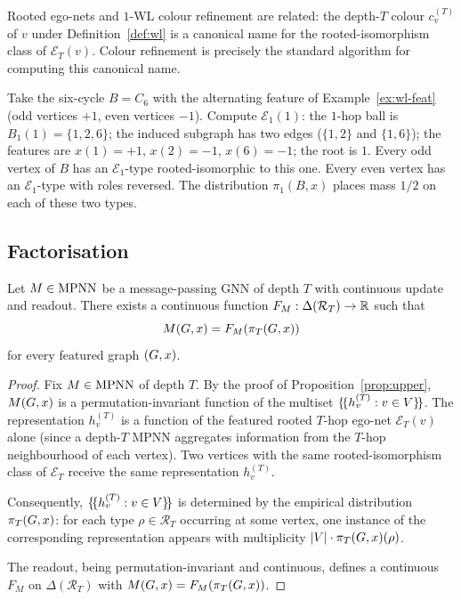 Rooted ego-nets and $1$-WL colour refinement are related: the
depth-$T$ colour $c_v^{(T)}$ of $v$ under Definition~\ref{def:wl} is a canonical
name for the rooted-isomorphism class of $\mathcal{E}_T(v)$. Colour
refinement is precisely the standard algorithm for computing this
canonical name.

\begin{example}\label{ex:egonet-c6}
Take the six-cycle $B = C_6$ with the alternating feature of
Example~\ref{ex:wl-feat} (odd vertices $+1$, even vertices $-1$). Compute
$\mathcal{E}_1(1)$: the $1$-hop ball is $B_1(1) = \{1, 2, 6\}$; the
induced subgraph has two edges ($\{1, 2\}$ and $\{1, 6\}$); the
features are $x(1) = +1$, $x(2) = -1$, $x(6) = -1$; the root is $1$.
Every odd vertex of $B$ has an $\mathcal{E}_1$-type
rooted-isomorphic to this one. Every even vertex has an
$\mathcal{E}_1$-type with roles reversed. The distribution $\pi_1(B,
x)$ places mass $1/2$ on each of these two types.
\end{example}

\subsection{Factorisation}

\begin{proposition}\label{prop:egonet-factorisation}
Let $M \in \mathrm{MPNN}$ be a message-passing GNN of depth $T$ with
continuous update and readout. There exists a continuous function
$F_M : \Delta(\mathcal{R}_T) \to \mathbb{R}$ such that
\[
M(G, x) = F_M\!\left(\pi_T(G, x)\right)
\]
for every featured graph $(G, x)$.
\end{proposition}

\begin{proof}
Fix $M \in \mathrm{MPNN}$ of depth $T$. By the proof of Proposition~\ref{prop:upper},
$M(G, x)$ is a permutation-invariant function of the multiset
$\{\!\{h_v^{(T)} : v \in V\}\!\}$. The representation
$h_v^{(T)}$ is a function of the featured rooted $T$-hop ego-net
$\mathcal{E}_T(v)$ alone (since a depth-$T$ MPNN aggregates information
from the $T$-hop neighbourhood of each vertex). Two vertices with the
same rooted-isomorphism class of $\mathcal{E}_T$ receive the same
representation $h_v^{(T)}$.

Consequently, $\{\!\{h_v^{(T)} : v \in V\}\!\}$ is determined
by the empirical distribution $\pi_T(G, x)$: for each type $\rho
\in \mathcal{R}_T$ occurring at some vertex, one instance of the
corresponding representation appears with multiplicity $|V|
\cdot \pi_T(G, x)(\rho)$.

The readout, being permutation-invariant and continuous, defines a
continuous $F_M$ on $\Delta(\mathcal{R}_T)$ with $M(G, x) =
F_M(\pi_T(G, x))$.
\end{proof}

